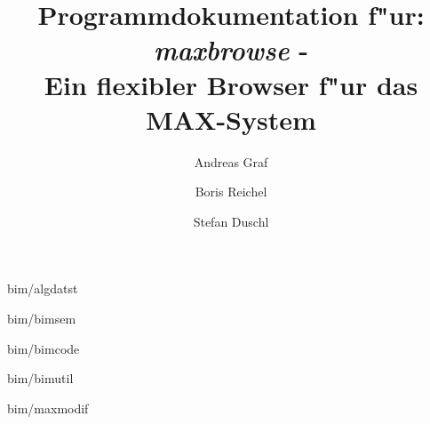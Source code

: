 
\originalTeX

\germanTeX

\pagestyle{plain}




\title{
Programmdokumentation f"ur:\\
\vspace*{1em}
{\em maxbrowse} -\\
Ein flexibler Browser f"ur das MAX-System}

\author{
  Andreas Graf
\and
  Boris Reichel
\and
  Stefan Duschl}

\maketitle

\pagebreak


\tableofcontents









 {bim/algdatst}

 {bim/bimsem}

 {bim/bimcode}

 {bim/bimutil}

 {bim/maxmodif}





